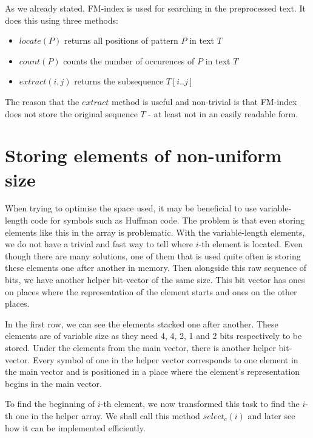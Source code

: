 As we already stated, FM-index is used for searching in the preprocessed text.
It does this using three methods:

\begin{itemize}
\item $locate(P)$ returns all positions of pattern $P$ in text $T$
\item $count(P)$ counts the number of occurences of $P$ in text $T$
\item $extract(i, j)$ returns the subsequence $T[i..j]$
\end{itemize}

The reason that the $extract$ method is useful and non-trivial is that FM-index
does not store the original sequence $T$ - at least not in an easily readable form.


\section{Storing elements of non-uniform size}

When trying to optimise the space used, it may be beneficial to use variable-length
code for symbols such as Huffman code. The problem is that even storing elements
like this in the array is problematic. With the variable-length elements, we do not
have a trivial and fast way to tell where $i$-th element is located. Even though
there are many solutions, one of them that is used quite often is storing these
elements one after another in memory. Then alongside this raw sequence of bits,
we have another helper bit-vector of the same size. This bit vector has ones on
places where the representation of the element starts and ones on the other places.

In the first row, we can see the elements stacked one after another. These elements
are of variable size as they need 4, 4, 2, 1 and 2 bits respectively to be stored.
Under the elements from the main vector, there is another helper bit-vector. Every
symbol of one in the helper vector corresponds to one element in the main vector
and is positioned in a place where the element's representation begins in the main vector.

To find the beginning of $i$-th element, we now transformed this task to find the
$i$-th one in the helper array. We shall call this method $select_c(i)$ and later
see how it can be implemented efficiently.

